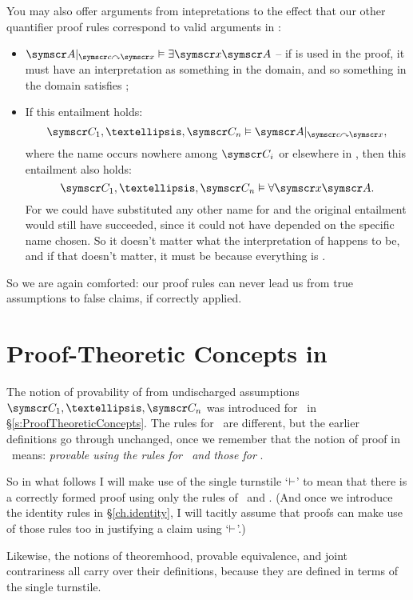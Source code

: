 You may also offer arguments from intepretations to the effect that our other quantifier proof rules correspond to valid arguments in \FOL:\begin{itemize}
	\item $\meta{A}\subs{\meta{c}}{\meta{x}} \entails \exists \meta{x}\meta{A}$ – if  is used in the proof, it must have an interpretation as something in the domain, and so something in the domain satisfies ;
	\item If this entailment holds: $$\meta{C}_{1},…,\meta{C}_{n} \entails \meta{A}\subs{\meta{c}}{\meta{x}},$$ where the name  occurs nowhere among $\meta{C}_{i}$ or elsewhere in , then this entailment also holds: $$\meta{C}_{1},…,\meta{C}_{n} \entails \forall\meta{x}\meta{A}.$$ For we could have substituted any other name for  and the original entailment would still have succeeded, since it could not have depended on the specific name chosen. So it doesn't matter what the interpretation of  happens to be, and if that doesn't matter, it must be because everything is .
\end{itemize} 


So we are again comforted: our proof rules can never lead us from true assumptions to false claims, if correctly applied.

\section{Proof-Theoretic Concepts in \FOL}

The notion of provability of  from undischarged assumptions $\meta{C}_{1},…,\meta{C}_{n}$ was introduced for \TFL\ in §\ref{s:ProofTheoreticConcepts}. The rules for \FOL\ are different, but the earlier definitions go through unchanged, once we remember that the notion of proof in \FOL\ means: \emph{provable using the rules for \TFL\ and those for \FOL}. 

So in what follows I will make use of the single turnstile `$\vdash$' to mean that there is a correctly formed proof using only the rules of \TFL\ and \FOL. (And once we introduce the identity rules in §\ref{ch.identity}, I will tacitly assume that proofs can make use of those rules too in justifying a claim using `$\vdash$'.) 

Likewise, the notions of theoremhood, provable equivalence, and joint contrariness all carry over their definitions, because they are defined in terms of the single turnstile.

